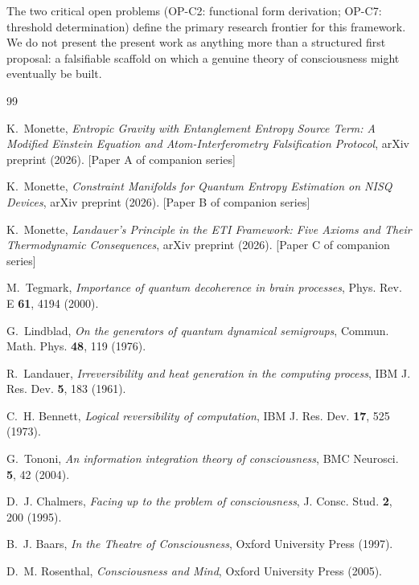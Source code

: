 \documentclass[12pt,letterpaper]{article}
\begin{document}
The two critical open problems (OP-C2: functional form derivation;
OP-C7: threshold determination) define the primary research frontier
for this framework. We do not present the present work as anything more
than a structured first proposal: a falsifiable scaffold on which a
genuine theory of consciousness might eventually be built.

\begin{thebibliography}{99}

K.~Monette,
\textit{Entropic Gravity with Entanglement Entropy Source Term: A Modified Einstein Equation and Atom-Interferometry Falsification Protocol},
arXiv preprint (2026). [Paper A of companion series]

K.~Monette,
\textit{Constraint Manifolds for Quantum Entropy Estimation on NISQ Devices},
arXiv preprint (2026). [Paper B of companion series]

K.~Monette,
\textit{Landauer's Principle in the ETI Framework: Five Axioms and Their Thermodynamic Consequences},
arXiv preprint (2026). [Paper C of companion series]

M.~Tegmark,
\textit{Importance of quantum decoherence in brain processes},
Phys. Rev. E \textbf{61}, 4194 (2000).

G.~Lindblad,
\textit{On the generators of quantum dynamical semigroups},
Commun. Math. Phys. \textbf{48}, 119 (1976).

R.~Landauer,
\textit{Irreversibility and heat generation in the computing process},
IBM J. Res. Dev. \textbf{5}, 183 (1961).

C.~H. Bennett,
\textit{Logical reversibility of computation},
IBM J. Res. Dev. \textbf{17}, 525 (1973).

G.~Tononi,
\textit{An information integration theory of consciousness},
BMC Neurosci. \textbf{5}, 42 (2004).

D.~J. Chalmers,
\textit{Facing up to the problem of consciousness},
J. Consc. Stud. \textbf{2}, 200 (1995).

B.~J. Baars,
\textit{In the Theatre of Consciousness},
Oxford University Press (1997).

D.~M. Rosenthal,
\textit{Consciousness and Mind},
Oxford University Press (2005).


\end{thebibliography}
\end{document}
